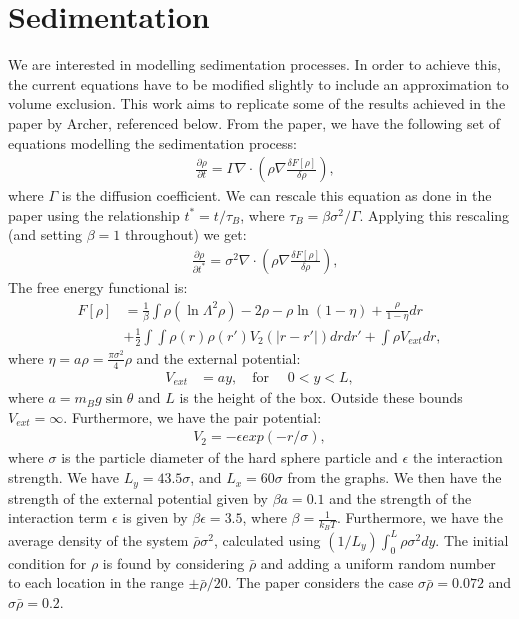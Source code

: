 \documentclass[11pt, a4paper]{article}
\theoremstyle{definition}
\begin{document}
	\section*{Sedimentation}
	We are interested in modelling sedimentation processes. In order to achieve this, the current equations have to be modified slightly to include an approximation to volume exclusion. This work aims to replicate some of the results achieved in the paper by Archer, referenced below.
	From the paper, we have the following set of equations modelling the sedimentation process:
	\begin{align*}
		&\frac{\partial \rho}{\partial t} = \Gamma\nabla \cdot \left(  \rho \nabla \frac{\delta F[\rho]}{\delta \rho} \right) ,
	\end{align*}
	where $\Gamma$ is the diffusion coefficient. 	
	We can rescale this equation as done in the paper using the relationship $t^* = t/ \tau_B$, where $\tau_B = \beta \sigma^2 / \Gamma$.
	Applying this rescaling (and setting $\beta = 1$ throughout) we get:
	\begin{align}\label{Eq1}
		&\frac{\partial \rho}{\partial t^*} = \sigma^2\nabla \cdot \left(  \rho \nabla \frac{\delta F[\rho]}{\delta \rho} \right) ,
	\end{align}
   The free energy functional is:
		\begin{align*}
		F[\rho] &= \frac{1}{\beta} \int \rho (\ln \Lambda^2 \rho) - 2 \rho - \rho \ln(1 - \eta) + \frac{\rho}{1 - \eta} dr\\
		&+ \frac{1}{2}\int \int \rho(r) \rho(r') V_2(|r - r'|) dr dr' + \int \rho V_{ext} dr,
	\end{align*}
	where $\eta = a \rho = \frac{\pi \sigma^2}{4} \rho$ and the external potential:
	\begin{align*}
			V_{ext} &= a y, \quad \text{for } \quad 0 < y < L,
	\end{align*}
    where $	a = m_B g \sin \theta$ and $L$ is the height of the box. Outside these bounds $V_{ext} = \infty$. 
    Furthermore, we have the pair potential:
	\begin{align*}
		V_2 = - \epsilon exp(-r/\sigma),
	\end{align*}
	where $\sigma$ is the particle diameter of the hard sphere particle and $\epsilon$ the interaction strength.
	We have $L_y = 43.5 \sigma$, and $L_x = 60 \sigma$ from the graphs. 
	We then have the strength of the external potential given by $\beta a = 0.1$ and the strength of the interaction term $\epsilon$ is given by $\beta \epsilon = 3.5$, where $\beta = \frac{1}{k_BT}$. 
	Furthermore, we have the average density of the system $\bar \rho \sigma^2$, calculated using $(1/L_y)\int_0^L \rho \sigma^2 dy$.
	The initial condition for $\rho$ is found by considering $\bar \rho$ and adding a uniform random number to each location in the range $\pm \bar \rho/ 20$. The paper considers the case $\sigma \bar \rho = 0.072$ and $\sigma \bar \rho = 0.2$.
\end{document}
